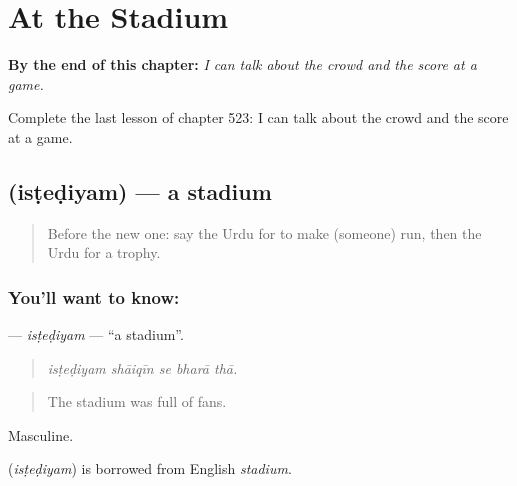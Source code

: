 
\chapter{At the Stadium}
\label{ch:ur-at-the-stadium}

\begin{chapteropening}
\textbf{By the end of this chapter:} \emph{I can talk about the crowd and the score at a game.}

Complete the last lesson of chapter 523: I can talk about the crowd and the score at a game.
\end{chapteropening}

\section[\texorpdfstring{\ur{اسٹیڈیم} (isṭeḍiyam)}{اسٹیڈیم (isṭeḍiyam)}]{ (isṭeḍiyam) — a stadium}

\label{lesson:UR-C523-istediyam}



\begin{quote}
Before the new one: say the Urdu for to make (someone) run, then the Urdu for a trophy.
\end{quote}

\subsection*{You'll want to know: }
\textbf{} — \emph{isṭeḍiyam} — \textquotedblleft{}a stadium\textquotedblright{}.

\begin{quote}
    
\end{quote}

\begin{quote}
\emph{isṭeḍiyam shāiqīn se bharā thā.}
\end{quote}

\begin{quote}
The stadium was full of fans.
\end{quote}

Masculine.

\begin{cousinweb}
\textbf{} (\emph{isṭeḍiyam}) is borrowed from English \emph{stadium}.
\end{cousinweb}

